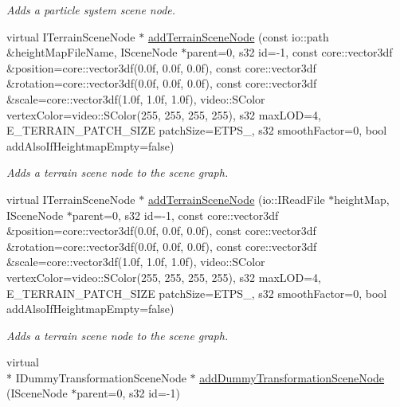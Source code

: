 \begin{DoxyCompactItemize}
\begin{DoxyCompactList}\small\item\em Adds a particle system scene node. \end{DoxyCompactList}\item 
\hypertarget{classirr_1_1scene_1_1_c_scene_manager_a13537c0fb00f9f34ed8cb407392d6735}{virtual I\-Terrain\-Scene\-Node $\ast$ \hyperlink{classirr_1_1scene_1_1_c_scene_manager_a13537c0fb00f9f34ed8cb407392d6735}{add\-Terrain\-Scene\-Node} (const io\-::path \&height\-Map\-File\-Name, I\-Scene\-Node $\ast$parent=0, s32 id=-\/1, const core\-::vector3df \&position=core\-::vector3df(0.\-0f, 0.\-0f, 0.\-0f), const core\-::vector3df \&rotation=core\-::vector3df(0.\-0f, 0.\-0f, 0.\-0f), const core\-::vector3df \&scale=core\-::vector3df(1.\-0f, 1.\-0f, 1.\-0f), video\-::\-S\-Color vertex\-Color=video\-::\-S\-Color(255, 255, 255, 255), s32 max\-L\-O\-D=4, E\-\_\-\-T\-E\-R\-R\-A\-I\-N\-\_\-\-P\-A\-T\-C\-H\-\_\-\-S\-I\-Z\-E patch\-Size=\-E\-T\-P\-S\-\_, s32 smooth\-Factor=0, bool add\-Also\-If\-Heightmap\-Empty=false)}\label{classirr_1_1scene_1_1_c_scene_manager_a13537c0fb00f9f34ed8cb407392d6735}

\begin{DoxyCompactList}\small\item\em Adds a terrain scene node to the scene graph. \end{DoxyCompactList}\item 
\hypertarget{classirr_1_1scene_1_1_c_scene_manager_a7982d65c64cca5df23d0f90b0f64ef66}{virtual I\-Terrain\-Scene\-Node $\ast$ \hyperlink{classirr_1_1scene_1_1_c_scene_manager_a7982d65c64cca5df23d0f90b0f64ef66}{add\-Terrain\-Scene\-Node} (io\-::\-I\-Read\-File $\ast$height\-Map, I\-Scene\-Node $\ast$parent=0, s32 id=-\/1, const core\-::vector3df \&position=core\-::vector3df(0.\-0f, 0.\-0f, 0.\-0f), const core\-::vector3df \&rotation=core\-::vector3df(0.\-0f, 0.\-0f, 0.\-0f), const core\-::vector3df \&scale=core\-::vector3df(1.\-0f, 1.\-0f, 1.\-0f), video\-::\-S\-Color vertex\-Color=video\-::\-S\-Color(255, 255, 255, 255), s32 max\-L\-O\-D=4, E\-\_\-\-T\-E\-R\-R\-A\-I\-N\-\_\-\-P\-A\-T\-C\-H\-\_\-\-S\-I\-Z\-E patch\-Size=\-E\-T\-P\-S\-\_, s32 smooth\-Factor=0, bool add\-Also\-If\-Heightmap\-Empty=false)}\label{classirr_1_1scene_1_1_c_scene_manager_a7982d65c64cca5df23d0f90b0f64ef66}

\begin{DoxyCompactList}\small\item\em Adds a terrain scene node to the scene graph. \end{DoxyCompactList}\item 
\hypertarget{classirr_1_1scene_1_1_c_scene_manager_a3ea274d7dd629d094d04029de18008b7}{virtual \\*
I\-Dummy\-Transformation\-Scene\-Node $\ast$ \hyperlink{classirr_1_1scene_1_1_c_scene_manager_a3ea274d7dd629d094d04029de18008b7}{add\-Dummy\-Transformation\-Scene\-Node} (I\-Scene\-Node $\ast$parent=0, s32 id=-\/1)}\label{classirr_1_1scene_1_1_c_scene_manager_a3ea274d7dd629d094d04029de18008b7}


\end{DoxyCompactItemize}
